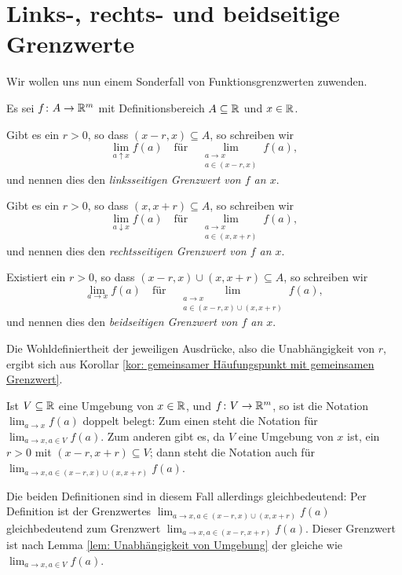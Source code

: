 \documentclass[a4paper,10pt]{article}
\begin{document}
\section{Links-, rechts- und beidseitige Grenzwerte}
Wir wollen uns nun einem Sonderfall von Funktionsgrenzwerten zuwenden.


\begin{defi}
 Es sei $f \colon A \to \mathbb{R}^m$ mit Definitionsbereich $A \subseteq \mathbb{R}$ und $x \in \mathbb{R}$.
 
 Gibt es ein $r > 0$, so dass $(x-r, x) \subseteq A$, so schreiben wir
 \[
  \lim_{a \uparrow x} f(a)
  \quad
  \text{für}
  \quad
  \lim_{\substack{a \to x \\ a \in (x-r,x)}} f(a),
 \]
 und nennen dies den \emph{linksseitigen Grenzwert von $f$ an $x$}.
 
 Gibt es ein $r > 0$, so dass $(x,x+r) \subseteq A$, so schreiben wir
 \[
  \lim_{a \downarrow x} f(a)
  \quad
  \text{für}
  \quad
  \lim_{\substack{a \to x \\ a \in (x,x+r)}} f(a),
 \]
 und nennen dies den \emph{rechtsseitigen Grenzwert von $f$ an $x$}.
 
 Existiert ein $r > 0$, so dass $(x-r,x) \cup (x,x+r) \subseteq A$, so schreiben wir
 \[
  \lim_{a \to x} f(a)
  \quad
  \text{für}
  \quad
  \lim_{\substack{a \to x \\ a \in (x-r,x) \cup (x,x+r)}} f(a),
 \]
 und nennen dies den \emph{beidseitigen Grenzwert von $f$ an $x$}.
\end{defi}


Die Wohldefiniertheit der jeweiligen Ausdrücke, also die Unabhängigkeit von $r$, ergibt sich aus Korollar \ref{kor: gemeinsamer Häufungspunkt mit gemeinsamen Grenzwert}.


\begin{bem}
 Ist $V \subseteq \mathbb{R}$ eine Umgebung von $x \in \mathbb{R}$, und $f \colon V \to \mathbb{R}^m$, so ist die Notation $\lim_{a \to x} f(a)$ doppelt belegt: Zum einen steht die Notation für $\lim_{a \to x, a \in V} f(a)$. Zum anderen gibt es, da $V$ eine Umgebung von $x$ ist, ein $r > 0$ mit $(x-r,x+r) \subseteq V$; dann steht die Notation auch für $\lim_{a \to x, a \in (x-r,x) \cup (x,x+r)} f(a)$.
 
 Die beiden Definitionen sind in diesem Fall allerdings gleichbedeutend: Per Definition ist der Grenzwertes $\lim_{a \to x, a \in (x-r,x) \cup (x,x+r)} f(a)$ gleichbedeutend zum Grenzwert $\lim_{a \to x, a \in (x-r,x+r)} f(a)$. Dieser Grenzwert ist nach Lemma \ref{lem: Unabhängigkeit von Umgebung} der gleiche wie $\lim_{a \to x, a \in V} f(a)$.
\end{bem}
\end{document}
